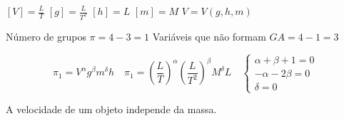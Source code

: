 $[V]=\frac{L}{T}$ 
$[g]=\frac{L}{T^{2}}$ 
$[h]=L$ 
$[m]=M$ 
$V=V(g,h,m)$ 

Número de grupos $\pi=4-3=1$ 
Variáveis que não formam $GA=4-1=3$ 

\[ \pi_{1}=V^{\alpha}g^{\beta}m^{\delta}h \quad \pi_{1}=\left(\frac{L}{T}\right)^{\alpha}\left(\frac{L}{T^{2}}\right)^{\beta}M^{\delta}L \quad \begin{cases}\alpha+\beta+1=0\\ -\alpha-2\beta=0\\ \delta=0\end{cases} \] 

A velocidade de um objeto independe da massa. 